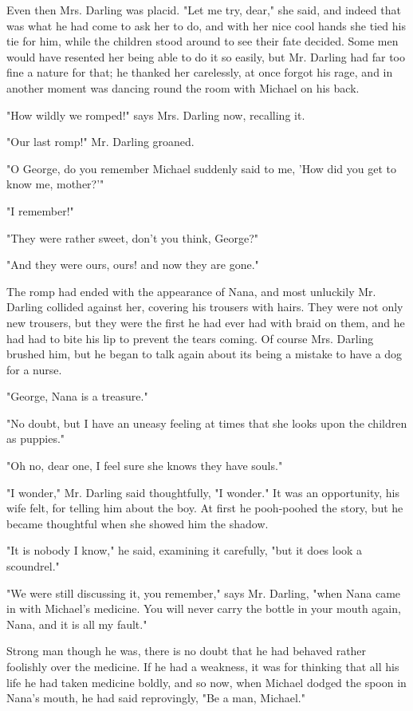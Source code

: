 Even then Mrs. Darling was placid. "Let me try, dear," she said, and
indeed that was what he had come to ask her to do, and with her nice cool
hands she tied his tie for him, while the children stood around to see
their fate decided. Some men would have resented her being able to do it
so easily, but Mr. Darling had far too fine a nature for that; he thanked
her carelessly, at once forgot his rage, and in another moment was dancing
round the room with Michael on his back.


"How wildly we romped!" says Mrs. Darling now, recalling it.


"Our last romp!" Mr. Darling groaned.


"O George, do you remember Michael suddenly said to me, 'How did you get
to know me, mother?'"


"I remember!"


"They were rather sweet, don't you think, George?"


"And they were ours, ours! and now they are gone."


The romp had ended with the appearance of Nana, and most unluckily Mr.
Darling collided against her, covering his trousers with hairs. They were
not only new trousers, but they were the first he had ever had with braid
on them, and he had had to bite his lip to prevent the tears coming. Of
course Mrs. Darling brushed him, but he began to talk again about its
being a mistake to have a dog for a nurse.


"George, Nana is a treasure."


"No doubt, but I have an uneasy feeling at times that she looks upon the
children as puppies."


"Oh no, dear one, I feel sure she knows they have souls."


"I wonder," Mr. Darling said thoughtfully, "I wonder." It was an
opportunity, his wife felt, for telling him about the boy. At first he
pooh-poohed the story, but he became thoughtful when she showed him the
shadow.


"It is nobody I know," he said, examining it carefully, "but it does look
a scoundrel."


"We were still discussing it, you remember," says Mr. Darling, "when Nana
came in with Michael's medicine. You will never carry the bottle in your
mouth again, Nana, and it is all my fault."


Strong man though he was, there is no doubt that he had behaved rather
foolishly over the medicine. If he had a weakness, it was for thinking
that all his life he had taken medicine boldly, and so now, when Michael
dodged the spoon in Nana's mouth, he had said reprovingly, "Be a man,
Michael."



